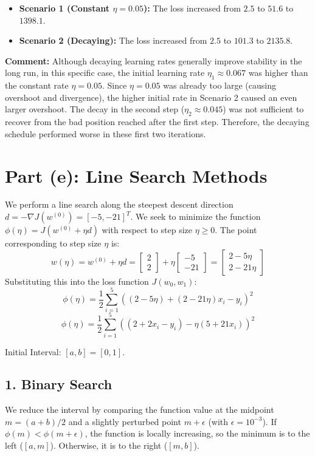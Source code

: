 \documentclass{article}
\begin{document}
\begin{itemize}
    \item \textbf{Scenario 1 (Constant $\eta=0.05$):} The loss increased from $2.5$ to $51.6$ to $1398.1$.
    \item \textbf{Scenario 2 (Decaying):} The loss increased from $2.5$ to $101.3$ to $2135.8$.
\end{itemize}

\textbf{Comment:} Although decaying learning rates generally improve stability in the long run, in this specific case, the initial learning rate $\eta_1 \approx 0.067$ was higher than the constant rate $\eta=0.05$. Since $\eta=0.05$ was already too large (causing overshoot and divergence), the higher initial rate in Scenario 2 caused an even larger overshoot. The decay in the second step ($\eta_2 \approx 0.045$) was not sufficient to recover from the bad position reached after the first step. Therefore, the decaying schedule performed worse in these first two iterations.

\section*{Part (e): Line Search Methods}
We perform a line search along the steepest descent direction $d = -\nabla J(w^{(0)}) = [-5, -21]^T$.
We seek to minimize the function $\phi(\eta) = J(w^{(0)} + \eta d)$ with respect to step size $\eta \ge 0$.
The point corresponding to step size $\eta$ is:
$$ w(\eta) = w^{(0)} + \eta d = \begin{bmatrix} 2 \\ 2 \end{bmatrix} + \eta \begin{bmatrix} -5 \\ -21 \end{bmatrix} = \begin{bmatrix} 2 - 5\eta \\ 2 - 21\eta \end{bmatrix} $$
Substituting this into the loss function $J(w_0, w_1)$:
$$ \phi(\eta) = \frac{1}{2}\sum_{i=1}^5 \left( (2 - 5\eta) + (2 - 21\eta)x_i - y_i \right)^2 $$
$$ \phi(\eta) = \frac{1}{2}\sum_{i=1}^5 \left( (2 + 2x_i - y_i) - \eta(5 + 21x_i) \right)^2 $$

Initial Interval: $[a, b] = [0, 1]$.

\subsection*{1. Binary Search}
We reduce the interval by comparing the function value at the midpoint $m = (a+b)/2$ and a slightly perturbed point $m + \epsilon$ (with $\epsilon = 10^{-3}$).
If $\phi(m) < \phi(m+\epsilon)$, the function is locally increasing, so the minimum is to the left ($[a, m]$). Otherwise, it is to the right ($[m, b]$).
\end{document}
